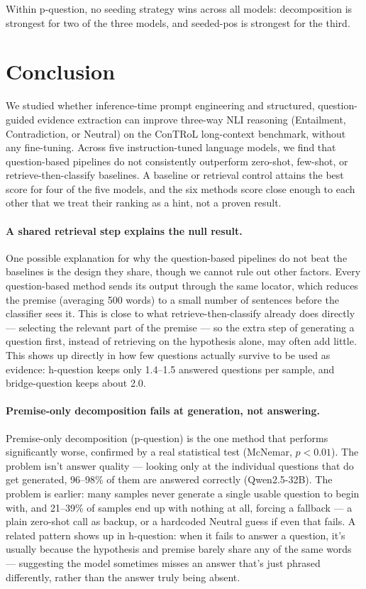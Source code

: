 \documentclass[11pt]{article}
\begin{document}
Within p-question, no seeding strategy wins across all models: decomposition
is strongest for two of the three models, and seeded-pos is strongest for
the third.

\section{Conclusion}

We studied whether inference-time prompt engineering and structured,
question-guided evidence extraction can improve three-way NLI reasoning
(Entailment, Contradiction, or Neutral) on the ConTRoL long-context
benchmark, without any fine-tuning. Across five instruction-tuned language
models, we find that question-based pipelines do not consistently
outperform zero-shot, few-shot, or retrieve-then-classify baselines. A
baseline or retrieval control attains the best score for four of the five
models, and the six methods score close enough to each other that we treat
their ranking as a hint, not a proven result.

\paragraph{A shared retrieval step explains the null result.} One possible
explanation for why the question-based pipelines do not beat the baselines
is the design they share, though we cannot rule out other factors. Every
question-based method sends its output through the same locator, which
reduces the premise (averaging 500 words) to a small number of sentences
before the classifier sees it. This is close to what retrieve-then-classify
already does directly --- selecting the relevant part of the premise --- so
the extra step of generating a question first, instead of retrieving on the
hypothesis alone, may often add little. This shows up directly in how few
questions actually survive to be used as evidence: h-question keeps only
1.4--1.5 answered questions per sample, and bridge-question keeps about 2.0.

\paragraph{Premise-only decomposition fails at generation, not answering.}
Premise-only decomposition (p-question) is the one method that performs
significantly worse, confirmed by a real statistical test (McNemar,
$p<0.01$). The problem isn't answer quality --- looking only at the
individual questions that do get generated, 96--98\% of them are answered
correctly (Qwen2.5-32B). The problem is earlier: many samples never
generate a single usable question to begin with, and 21--39\% of samples
end up with nothing at all, forcing a fallback --- a plain zero-shot call
as backup, or a hardcoded Neutral guess if even that fails. A related
pattern shows up in h-question: when it fails to answer a question, it's
usually because the hypothesis and premise barely share any of the same
words --- suggesting the model sometimes misses an answer that's just
phrased differently, rather than the answer truly being absent.
\end{document}
